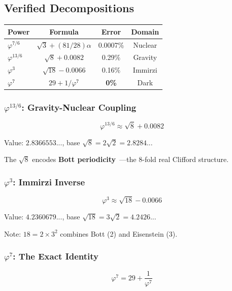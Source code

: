 \documentclass[aps,prd,twocolumn,superscriptaddress,floatfix,nofootinbib]{revtex4-2}
\theoremstyle{definition}
\theoremstyle{remark}
\newcommand{\vp}{\varphi}
\begin{document}
\subsection{Verified Decompositions}

\begin{center}
\begin{tabular}{lccc}
\toprule
Power & Formula & Error & Domain \\
\midrule
$\vp^{7/6}$ & $\sqrt{3} + (81/28)\alpha$ & 0.0007\% & Nuclear \\
$\vp^{13/6}$ & $\sqrt{8} + 0.0082$ & 0.29\% & Gravity \\
$\vp^3$ & $\sqrt{18} - 0.0066$ & 0.16\% & Immirzi \\
$\vp^7$ & $29 + 1/\vp^7$ & \textbf{0\%} & Dark \\
\bottomrule
\end{tabular}
\end{center}

\subsubsection{$\vp^{13/6}$: Gravity-Nuclear Coupling}

\begin{equation}
\boxed{\vp^{13/6} \approx \sqrt{8} + 0.0082}
\end{equation}

Value: $2.8366553...$, base $\sqrt{8} = 2\sqrt{2} = 2.8284...$

The $\sqrt{8}$ encodes \textbf{Bott periodicity}~\cite{bott}---the 8-fold real Clifford structure.

\subsubsection{$\vp^3$: Immirzi Inverse}

\begin{equation}
\boxed{\vp^3 \approx \sqrt{18} - 0.0066}
\end{equation}

Value: $4.2360679...$, base $\sqrt{18} = 3\sqrt{2} = 4.2426...$

Note: $18 = 2 \times 3^2$ combines Bott (2) and Eisenstein (3).

\subsubsection{$\vp^7$: The Exact Identity}

\begin{equation}
\boxed{\vp^7 = 29 + \frac{1}{\vp^7}}
\end{equation}
\end{document}
